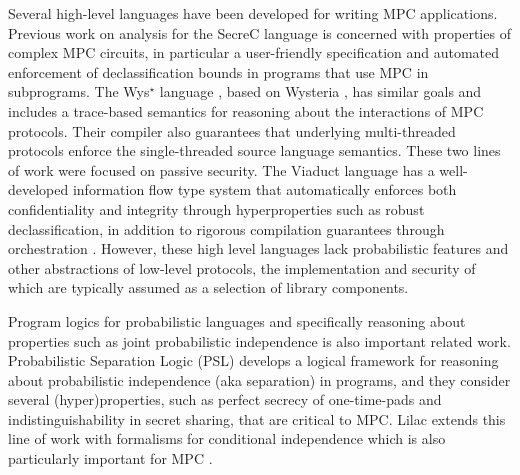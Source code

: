 Several high-level languages have been developed for writing MPC
applications. Previous work on analysis for the
SecreC language \cite{almeida2018enforcing,10.1145/2637113.2637119} is
concerned with properties of complex MPC circuits, in particular a
user-friendly specification and automated enforcement of
declassification bounds in programs that use MPC in subprograms. The
Wys$^\star$ language \cite{wysstar}, based on Wysteria
\cite{rastogi2014wysteria}, has similar goals and includes a
trace-based semantics for reasoning about the interactions of MPC
protocols. Their compiler also guarantees that underlying
multi-threaded protocols enforce the single-threaded source language
semantics. These two lines of work were focused on passive
security. The Viaduct language \cite{10.1145/3453483.3454074} has a
well-developed information flow type system that automatically
enforces both confidentiality and integrity through hyperproperties
such as robust declassification, in addition to rigorous compilation
guarantees through orchestration \cite{viaduct-UC}. However, these
high level languages lack probabilistic features and other
abstractions of low-level protocols, the implementation and security
of which are typically assumed as a selection of library components.

Program logics for probabilistic languages and specifically reasoning
about properties such as joint probabilistic independence is also
important related work. Probabilistic Separation Logic (PSL)
\cite{barthe2019probabilistic} develops a logical framework for
reasoning about probabilistic independence (aka separation) in
programs, and they consider several (hyper)properties, such as perfect
secrecy of one-time-pads and indistinguishability in secret sharing,
that are critical to MPC. Lilac \cite{li2023lilac} extends this line
of work with formalisms for conditional independence which is 
also particularly important for MPC \cite{skalka-near-ppdp24}.

